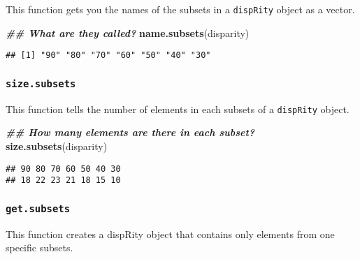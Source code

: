 \documentclass[
]{book}
\newenvironment{Shaded}{\begin{snugshade}}{\end{snugshade}}
\newcommand{\DocumentationTok}[1]{\textcolor[rgb]{0.56,0.35,0.01}{\textbf{\textit{#1}}}}
\newcommand{\FunctionTok}[1]{\textcolor[rgb]{0.13,0.29,0.53}{\textbf{#1}}}
\newcommand{\NormalTok}[1]{#1}
\newcommand{\OtherTok}[1]{\textcolor[rgb]{0.56,0.35,0.01}{#1}}
\newcommand{\SpecialCharTok}[1]{\textcolor[rgb]{0.81,0.36,0.00}{\textbf{#1}}}
\newcommand{\StringTok}[1]{\textcolor[rgb]{0.31,0.60,0.02}{#1}}
\begin{document}
This function gets you the names of the subsets in a \texttt{dispRity} object as a vector.

\begin{Shaded}
\begin{Highlighting}[]
\DocumentationTok{\#\# What are they called?}
\FunctionTok{name.subsets}\NormalTok{(disparity)}
\end{Highlighting}
\end{Shaded}

\begin{verbatim}
## [1] "90" "80" "70" "60" "50" "40" "30"
\end{verbatim}

\hypertarget{size.subsets}{%
\subsubsection{\texorpdfstring{\texttt{size.subsets}}{size.subsets}}\label{size.subsets}}

This function tells the number of elements in each subsets of a \texttt{dispRity} object.

\begin{Shaded}
\begin{Highlighting}[]
\DocumentationTok{\#\# How many elements are there in each subset?}
\FunctionTok{size.subsets}\NormalTok{(disparity)}
\end{Highlighting}
\end{Shaded}

\begin{verbatim}
## 90 80 70 60 50 40 30 
## 18 22 23 21 18 15 10
\end{verbatim}

\hypertarget{get.subsets}{%
\subsubsection{\texorpdfstring{\texttt{get.subsets}}{get.subsets}}\label{get.subsets}}

This function creates a dispRity object that contains only elements from one specific subsets.

\begin{Shaded}
\end{Shaded}
\end{document}
